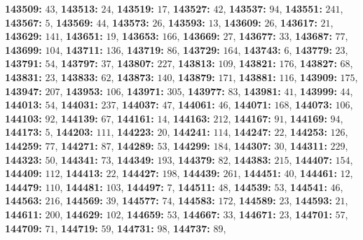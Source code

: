 \textsf{\bfseries 143509:} $43$, \textsf{\bfseries 143513:} $24$, \textsf{\bfseries 143519:} $17$, \textsf{\bfseries 143527:} $42$, \textsf{\bfseries 143537:} $94$, \textsf{\bfseries 143551:} $241$, \textsf{\bfseries 143567:} $5$, \textsf{\bfseries 143569:} $44$, \textsf{\bfseries 143573:} $26$, \textsf{\bfseries 143593:} $13$, \textsf{\bfseries 143609:} $26$, \textsf{\bfseries 143617:} $21$, \textsf{\bfseries 143629:} $141$, \textsf{\bfseries 143651:} $19$, \textsf{\bfseries 143653:} $166$, \textsf{\bfseries 143669:} $27$, \textsf{\bfseries 143677:} $33$, \textsf{\bfseries 143687:} $77$, \textsf{\bfseries 143699:} $104$, \textsf{\bfseries 143711:} $136$, \textsf{\bfseries 143719:} $86$, \textsf{\bfseries 143729:} $164$, \textsf{\bfseries 143743:} $6$, \textsf{\bfseries 143779:} $23$, \textsf{\bfseries 143791:} $54$, \textsf{\bfseries 143797:} $37$, \textsf{\bfseries 143807:} $227$, \textsf{\bfseries 143813:} $109$, \textsf{\bfseries 143821:} $176$, \textsf{\bfseries 143827:} $68$, \textsf{\bfseries 143831:} $23$, \textsf{\bfseries 143833:} $62$, \textsf{\bfseries 143873:} $140$, \textsf{\bfseries 143879:} $171$, \textsf{\bfseries 143881:} $116$, \textsf{\bfseries 143909:} $175$, \textsf{\bfseries 143947:} $207$, \textsf{\bfseries 143953:} $106$, \textsf{\bfseries 143971:} $305$, \textsf{\bfseries 143977:} $83$, \textsf{\bfseries 143981:} $41$, \textsf{\bfseries 143999:} $44$, \textsf{\bfseries 144013:} $54$, \textsf{\bfseries 144031:} $237$, \textsf{\bfseries 144037:} $47$, \textsf{\bfseries 144061:} $46$, \textsf{\bfseries 144071:} $168$, \textsf{\bfseries 144073:} $106$, \textsf{\bfseries 144103:} $92$, \textsf{\bfseries 144139:} $67$, \textsf{\bfseries 144161:} $14$, \textsf{\bfseries 144163:} $212$, \textsf{\bfseries 144167:} $91$, \textsf{\bfseries 144169:} $94$, \textsf{\bfseries 144173:} $5$, \textsf{\bfseries 144203:} $111$, \textsf{\bfseries 144223:} $20$, \textsf{\bfseries 144241:} $114$, \textsf{\bfseries 144247:} $22$, \textsf{\bfseries 144253:} $126$, \textsf{\bfseries 144259:} $77$, \textsf{\bfseries 144271:} $87$, \textsf{\bfseries 144289:} $53$, \textsf{\bfseries 144299:} $184$, \textsf{\bfseries 144307:} $30$, \textsf{\bfseries 144311:} $229$, \textsf{\bfseries 144323:} $50$, \textsf{\bfseries 144341:} $73$, \textsf{\bfseries 144349:} $193$, \textsf{\bfseries 144379:} $82$, \textsf{\bfseries 144383:} $215$, \textsf{\bfseries 144407:} $154$, \textsf{\bfseries 144409:} $112$, \textsf{\bfseries 144413:} $22$, \textsf{\bfseries 144427:} $198$, \textsf{\bfseries 144439:} $261$, \textsf{\bfseries 144451:} $40$, \textsf{\bfseries 144461:} $12$, \textsf{\bfseries 144479:} $110$, \textsf{\bfseries 144481:} $103$, \textsf{\bfseries 144497:} $7$, \textsf{\bfseries 144511:} $48$, \textsf{\bfseries 144539:} $53$, \textsf{\bfseries 144541:} $46$, \textsf{\bfseries 144563:} $216$, \textsf{\bfseries 144569:} $39$, \textsf{\bfseries 144577:} $74$, \textsf{\bfseries 144583:} $172$, \textsf{\bfseries 144589:} $23$, \textsf{\bfseries 144593:} $21$, \textsf{\bfseries 144611:} $200$, \textsf{\bfseries 144629:} $102$, \textsf{\bfseries 144659:} $53$, \textsf{\bfseries 144667:} $33$, \textsf{\bfseries 144671:} $23$, \textsf{\bfseries 144701:} $57$, \textsf{\bfseries 144709:} $71$, \textsf{\bfseries 144719:} $59$, \textsf{\bfseries 144731:} $98$, \textsf{\bfseries 144737:} $89$, 
